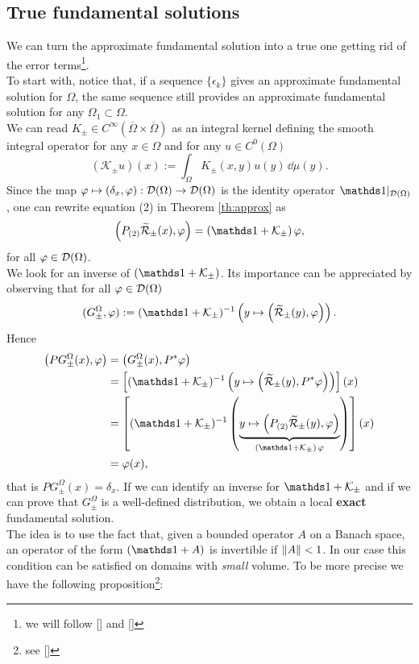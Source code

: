 \subsection{True fundamental solutions}
We can turn the approximate fundamental solution into a true one getting rid of the error terms\footnote{we will follow [\citealp[Sec 3.3.3]{ginoux}] and [\citealp[Sec 2.2.3]{bar2}]}.\\ To start with, notice that, if a sequence $\{\epsilon_k\}$ gives an approximate fundamental solution for $\Omega$, the same sequence still provides an approximate fundamental solution for any $\Omega_1\subset\Omega$.\\

\noindent We can read $K_\pm\in C^\infty(\overline{\Omega}\times\overline{\Omega})$ as an integral kernel defining the smooth integral operator for any $x\in\Omega$ and for any $u\in C^0(\Omega)$
\begin{equation}
	(\mathcal{K}_\pm u)(x):=\int_{\Omega}K_\pm(x,y)u(y)\,\dd\mu(y).
\end{equation}
Since the map $\varphi\mapsto(\delta_x,\varphi):\mathcal{D}(\Omega)\to\mathcal{D}(\Omega)$ is the identity operator $\id|_{\mD(\Omega)}$, one can rewrite equation (2) in Theorem \ref{th:approx} as
\[	\left(P_{(2)}	\widetilde{\mathcal{R}}_\pm(x),\varphi\right)=(\id+\mathcal{K}_\pm)\,\varphi,	\]
for all $\varphi\in\mathcal{D}(\Omega)$.\\
We look for an inverse of $(\id+\mathcal{K_\pm})$. Its importance can be appreciated by observing that for all $\varphi\in\mathcal{D}(\Omega)$
\begin{equation}
	(G_\pm^\Omega,\varphi):=(\id+\mathcal{K_\pm})^{-1}\left(y\mapsto\left(\widetilde{\mathcal{R}}_\pm(y),\varphi\right)\right).
	\label{eq:truelocal}
\end{equation}
Hence
\[	\begin{aligned}
\left(PG_\pm^\Omega(x),\varphi\right)&=\left(G_\pm^\Omega(x),P^*\varphi\right)\\
&=\left[	(\id+\mathcal{K_\pm})^{-1}\left(y\mapsto\left(\widetilde{\mathcal{R}}_\pm(y),P^*\varphi\right)\right)	\right](x)\\
&=\left[	(\id+\mathcal{K_\pm})^{-1}\left(\underbrace{y\mapsto\left(P_{(2)}\widetilde{\mathcal{R}}_\pm(y),\varphi\right)}_{(\id+\mathcal{K}_\pm)\,\varphi}\right)	\right](x)\\
&=\varphi(x),
\end{aligned}			\]
that is $PG_\pm^\Omega(x)=\delta_x$. If we can identify an inverse for $\id+\mathcal{K}_\pm$ and if we can prove that $G_\pm^\Omega$ is a well-defined distribution, we obtain a local \textbf{exact} fundamental solution.\\
The idea is to use the fact that, given a bounded operator $A$ on a Banach space, an operator of the form $(\id+A)$ is invertible if $\displaystyle \left \| A \right \|<1$. In our case this condition can be satisfied on domains with \emph{small} volume. To be more precise we have the following proposition\footnote{see [\citealp[Lem 2.4.8]{bar1}]}:

